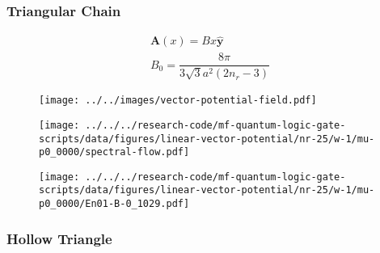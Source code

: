 \documentclass[xcolor=dvipsnames,10pt,aspectratio=169]{beamer}
\let\oldhat\hat
\renewcommand{\hat}[1]{\oldhat{\mathbf{#1}}}
\renewcommand{\vec}[1]{\mathbf{#1}}
\begin{document}
  \begin{frame}
    \frametitle{Triangular Chain}

    \begin{multicols}{2}
    \vspace{-2em}
    \small
    \begin{gather*}
      \vec{A}(x) = B x \hat{y} \\
      B_0 = \dfrac{8 \pi}{3\sqrt{3} a^2 (2 n_r - 3)}
    \end{gather*}

    \vspace{-4em}
    \begin{figure}
      \texttt{[image: ../../images/vector-potential-field.pdf]}
    \end{figure}

    \begin{figure}
      \center
      \hspace{-1.25em}
      \texttt{[image: ../../../research-code/mf-quantum-logic-gate-scripts/data/figures/linear-vector-potential/nr-25/w-1/mu-p0\_0000/spectral-flow.pdf]}
    \end{figure}

    \vspace{-1em}

    \begin{figure}
      \texttt{[image: ../../../research-code/mf-quantum-logic-gate-scripts/data/figures/linear-vector-potential/nr-25/w-1/mu-p0\_0000/En01-B-0\_1029.pdf]}
    \end{figure}
    \end{multicols}

  \end{frame}

  \begin{frame}
    \frametitle{Hollow Triangle}

    \begin{figure}
    \end{figure}
  \end{frame}
\end{document}
